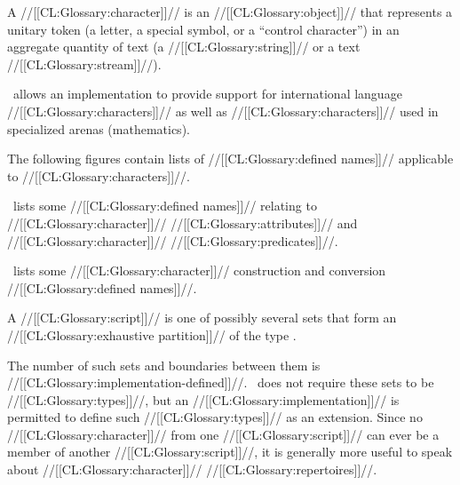

 

A //[[CL:Glossary:character]]// is an //[[CL:Glossary:object]]// that represents a unitary token  (\eg a letter, a special symbol, or a ``control character'') in an aggregate quantity of text (\eg a //[[CL:Glossary:string]]// or a text //[[CL:Glossary:stream]]//).

 \clisp\ allows an implementation to provide support  for international language //[[CL:Glossary:characters]]// as well as //[[CL:Glossary:characters]]// used in specialized arenas (\eg mathematics).

The following figures contain lists of //[[CL:Glossary:defined names]]// applicable to  //[[CL:Glossary:characters]]//.

\Thenextfigure\ lists some //[[CL:Glossary:defined names]]// relating to  //[[CL:Glossary:character]]// //[[CL:Glossary:attributes]]// and //[[CL:Glossary:character]]// //[[CL:Glossary:predicates]]//.

                            \Thenextfigure\ lists some //[[CL:Glossary:character]]// construction and conversion //[[CL:Glossary:defined names]]//.


\endsubSection%


 

A //[[CL:Glossary:script]]// is one of possibly several sets that form an //[[CL:Glossary:exhaustive partition]]// of the type .

The number of such sets and boundaries between them is //[[CL:Glossary:implementation-defined]]//. \clisp\ does not require these sets to be //[[CL:Glossary:types]]//, but an //[[CL:Glossary:implementation]]// is permitted to define such //[[CL:Glossary:types]]// as an extension.  Since no //[[CL:Glossary:character]]// from one //[[CL:Glossary:script]]// can ever be a member of another //[[CL:Glossary:script]]//, it is generally more useful to speak about //[[CL:Glossary:character]]// //[[CL:Glossary:repertoires]]//.

